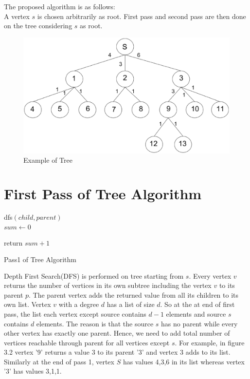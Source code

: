 \hspace{-1.5em}The proposed algorithm is as follows:
\\
A vertex $s$ is chosen arbitrarily as root. First pass and second pass are then done on the tree considering $s$ as root.

\begin{figure}[htp]
\centering
\includegraphics[width=13cm]{images/exampletree.eps}
\caption{Example of Tree}
\label{fig:extree}
\end{figure}

\section{First Pass of Tree Algorithm}
\begin{algorithm}
dfs$(child, parent)$ \\
$sum \leftarrow 0$\;

return $sum + 1$\;
\caption{Pass1 of Tree Algorithm}

\end{algorithm}
Depth First Search(DFS) is performed on tree starting from $s$. Every vertex $v$ returns the number of vertices in its own subtree including the vertex $v$ to its parent $p$. The parent vertex adds the returned value from all its children to its own list.
Vertex $v$ with a degree $d$ has a list of size $d$.
So at the at end of first pass, the list each vertex except source contains $d-1$ elements and source $s$ contains $d$ elements. The reason is that the source $s$ has no parent while every other vertex has exactly one parent. Hence, we need to add total number of vertices reachable through parent for all vertices except $s$.
For example, in figure 3.2 vertex '9' returns a value 3 to its parent '3' and vertex 3 adds to its list. Similarly at the end of pass 1, vertex $S$ has values 4,3,6 in its list whereas vertex '3' has values 3,1,1. 
\vspace{-1.0em}
